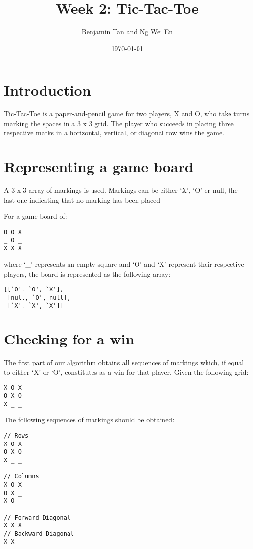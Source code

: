 \documentclass{article}
\title{Week 2: Tic-Tac-Toe}
\author{Benjamin Tan and Ng Wei En}
\date{\today}
\begin{document}
\maketitle

\section{Introduction}

Tic-Tac-Toe is a paper-and-pencil game for two players, X and O, who take turns marking the spaces in a 3 x 3 grid. The player who succeeds in placing three respective marks in a horizontal, vertical, or diagonal row wins the game.

\section{Representing a game board}

A 3 x 3 array of markings is used. Markings can be either `X', `O' or null, the last one indicating that no marking has been placed.

For a game board of:

\begin{verbatim}
O O X
_ O _
X X X
\end{verbatim}

where `\_' represents an empty square and `O' and `X' represent their respective players, the board is represented as the following array:

\begin{verbatim}
[[`O', `O', `X'],
 [null, `O', null],
 [`X', `X', `X']]
\end{verbatim}

\section{Checking for a win}

The first part of our algorithm obtains all sequences of markings which, if equal to either `X' or `O', constitutes as a win for that player. Given the following grid:

\begin{verbatim}
X O X
O X O
X _ _
\end{verbatim}

The following sequences of markings should be obtained:

\begin{verbatim}
// Rows
X O X
O X O
X _ _

// Columns
X O X
O X _
X O _

// Forward Diagonal
X X X
// Backward Diagonal
X X _
\end{verbatim}
\end{document}
